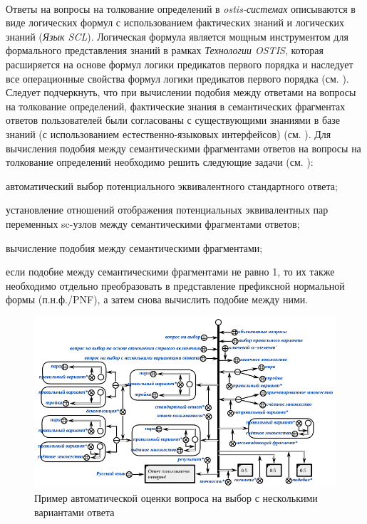 ~\\
Ответы на вопросы на толкование определений в \textit{ostis-системах} описываются в виде логических формул с использованием фактических знаний и логических знаний (\textit{Язык SCL}). Логическая формула является мощным инструментом для формального представления знаний в рамках \textit{Технологии OSTIS}, которая расширяется на основе формул логики предикатов первого порядка и наследует все операционные свойства формул логики предикатов первого порядка (см. ). Следует подчеркнуть, что при вычислении подобия между ответами на вопросы на толкование определений, фактические знания в семантических фрагментах ответов пользователей были согласованы с существующими знаниями в базе знаний (с использованием естественно-языковых интерфейсов) (см. ). Для вычисления подобия между семантическими фрагментами ответов на вопросы на толкование определений необходимо решить следующие задачи (см. ):

\begin{textitemize}
	\item автоматический выбор потенциального эквивалентного стандартного ответа;
	\item установление отношений отображения потенциальных эквивалентных пар переменных sc-узлов между семантическими фрагментами ответов;
	\item вычисление подобия между семантическими фрагментами;
	\item если подобие между семантическими фрагментами не равно 1, то их также необходимо отдельно преобразовать в представление префиксной нормальной формы (п.н.ф./PNF), а затем снова вычислить подобие между ними.
\end{textitemize}

\begin{figure}[H]
	\includegraphics[scale=0.7]{author/part7/figures/answer_verification_example.png}
	\caption{Пример автоматической оценки вопроса на выбор с несколькими вариантами ответа}
	\label{fig:AV_example}
\end{figure}

